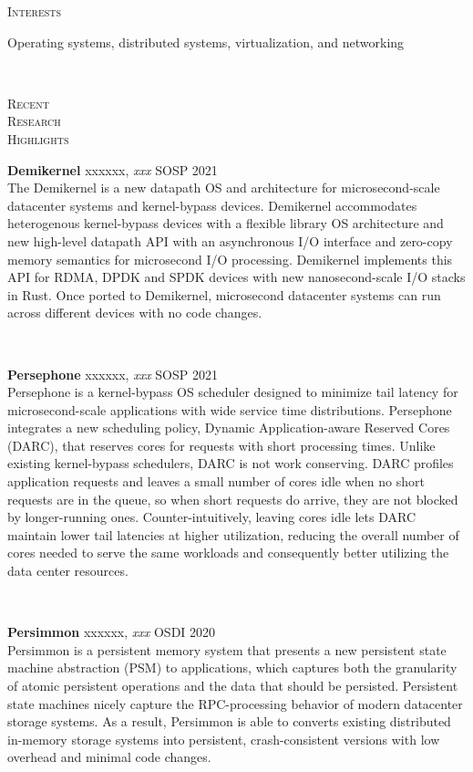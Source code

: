 \documentclass[10pt,times]{report}
\newlength{\sectiongap}
\newlength{\entrygap}
\newlength{\sectioncolwidth}
\newlength{\colgap}
\newlength{\stuffwidth}
\def\ifEqString#1#2{\def\testa{#1}\def\testb{#2}%
  \ifx\testa\testb}
\newenvironment{rtable}{
  \begin{minipage}{\textwidth}
  }{
  \end{minipage}
}
\newenvironment{rentry}[3][xxx]{
  \begin{minipage}[t]{\hsize}
    \textbf{#2}\ifEqString{#1}{xxx}\relax\else, \textit{#1}\fi
    \hspace{\stretch{1}} #3 \\
  }{
    \removelastskip
  \end{minipage}
  \\[\entrygap]  %
}
\newenvironment{rsection}[1]{
  \begin{minipage}[t]{\sectioncolwidth}
    \textsc{#1}
  \end{minipage}
  \hspace{\colgap}
  \begin{minipage}[t]{\stuffwidth}
  }{
    \removelastskip
  \end{minipage}
  \\[\sectiongap]
}
\begin{document}
\begin{rtable}
  \begin{rsection}{Interests}
    Operating systems, distributed systems, virtualization, and networking
  \end{rsection}
  
  \begin{rsection}{Recent\\Research\\Highlights}
    \begin{rentry}{Demikernel}{SOSP 2021}
      The Demikernel is a new datapath OS and architecture for
      microsecond-scale datacenter systems and kernel-bypass
      devices. Demikernel accommodates heterogenous kernel-bypass
      devices with a flexible library OS architecture and new
      high-level datapath API with an asynchronous I/O interface and
      zero-copy memory semantics for microsecond I/O
      processing. Demikernel implements this API for RDMA, DPDK and
      SPDK devices with new nanosecond-scale I/O stacks in Rust. Once
      ported to Demikernel, microsecond datacenter systems can run
      across different devices with no code changes.
    \end{rentry}
    
    \begin{rentry}{Persephone}{SOSP 2021}
      Persephone is a kernel-bypass OS scheduler designed to minimize
      tail latency for microsecond-scale applications with wide
      service time distributions. Persephone integrates a new
      scheduling policy, Dynamic Application-aware Reserved Cores
      (DARC), that reserves cores for requests with short processing
      times. Unlike existing kernel-bypass schedulers, DARC is not
      work conserving. DARC profiles application requests and leaves a
      small number of cores idle when no short requests are in the
      queue, so when short requests do arrive, they are not blocked by
      longer-running ones. Counter-intuitively, leaving cores idle
      lets DARC maintain lower tail latencies at higher utilization,
      reducing the overall number of cores needed to serve the same
      workloads and consequently better utilizing the data center
      resources.
    \end{rentry}
    
    \begin{rentry}{Persimmon}{OSDI 2020}
          Persimmon is a persistent memory system that presents a new
          persistent state machine abstraction (PSM) to applications,
          which captures both the granularity of atomic persistent
          operations and the data that should be persisted. Persistent
          state machines nicely capture the RPC-processing behavior of
          modern datacenter storage systems. As a result, Persimmon is
          able to converts existing distributed in-memory storage
          systems into persistent, crash-consistent versions with low
          overhead and minimal code changes.
    \end{rentry}

  \end{rsection}    
\end{rtable}
\end{document}
